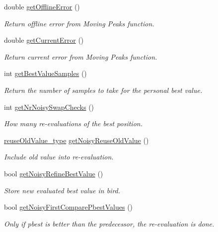 \begin{CompactItemize}
double \hyperlink{classPSO_0c423a292faf4353a3039d10581f4c0e}{getOfflineError} ()
\begin{CompactList}\small\item\em Return offline error from Moving Peaks function. \item\end{CompactList}\item 
double \hyperlink{classPSO_a56f29351f5e977af61ffd7e79f22b1f}{getCurrentError} ()
\begin{CompactList}\small\item\em Return current error from Moving Peaks function. \item\end{CompactList}\item 
int \hyperlink{classPSO_4f9d31231c71b309637baabc38dafe8e}{getBestValueSamples} ()
\begin{CompactList}\small\item\em Return the number of samples to take for the personal best value. \item\end{CompactList}\item 
int \hyperlink{classPSO_d69012e1331e93c50a3c7ec9ebc3d9a1}{getNrNoisySwapChecks} ()
\begin{CompactList}\small\item\em How many re-evaluations of the best position. \item\end{CompactList}\item 
\hyperlink{pso_8h_755d79b857f07ae8fe54530574012aa0}{reuseOldValue\_\-type} \hyperlink{classPSO_b7fa34d665f860e11c91545314a81e39}{getNoisyReuseOldValue} ()
\begin{CompactList}\small\item\em Include old value into re-evaluation. \item\end{CompactList}\item 
bool \hyperlink{classPSO_9f0db9ddf94a915706314de77161e556}{getNoisyRefineBestValue} ()
\begin{CompactList}\small\item\em Store new evaluated best value in bird. \item\end{CompactList}\item 
bool \hyperlink{classPSO_21328296d8a9c44a0cbef8f4f32d632e}{getNoisyFirstComparePbestValues} ()
\begin{CompactList}\small\item\em Only if pbest is better than the predecessor, the re-evaluation is done. \item\end{CompactList}\item 

\end{CompactItemize}
